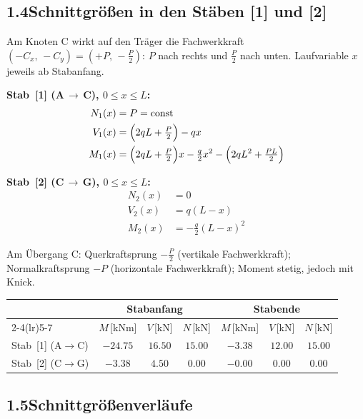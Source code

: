 \documentclass[a4paper,11pt]{article}
\begin{document}
\subsection*{1.4\quad Schnittgrößen in den Stäben [1] und [2]}

Am Knoten C wirkt auf den Träger die Fachwerkkraft
$(-C_x,\,-C_y) = (+P,\,-\tfrac{P}{2})$:
$P$ nach rechts und $\tfrac{P}{2}$ nach unten.
Laufvariable $x$ jeweils ab Stabanfang.

\textbf{Stab~[1] (A\,$\to$\,C), $0 \le x \le L$:}
\begin{align*}
  N_1(x) &= P = \text{const} \\
  V_1(x) &= \Bigl(2qL + \tfrac{P}{2}\Bigr) - qx \\
  M_1(x) &= \Bigl(2qL + \tfrac{P}{2}\Bigr)x - \tfrac{q}{2}x^2
            - \Bigl(2qL^2 + \tfrac{PL}{2}\Bigr)
\end{align*}

\textbf{Stab~[2] (C\,$\to$\,G), $0 \le x \le L$:}
\begin{align*}
  N_2(x) &= 0 \\
  V_2(x) &= q(L - x) \\
  M_2(x) &= -\tfrac{q}{2}(L - x)^2
\end{align*}

Am Übergang C: Querkraftsprung $-\tfrac{P}{2}$ (vertikale Fachwerkkraft);
Normalkraftsprung $-P$ (horizontale Fachwerkkraft); Moment stetig, jedoch mit Knick.

\medskip
\begin{center}
\begin{tabular}{l cccccc}
\toprule
 & \multicolumn{3}{c}{\textbf{Stabanfang}} & \multicolumn{3}{c}{\textbf{Stabende}} \\
\cmidrule(lr){2-4}\cmidrule(lr){5-7}
 & $M$\,[kNm] & $V$\,[kN] & $N$\,[kN]
 & $M$\,[kNm] & $V$\,[kN] & $N$\,[kN] \\
\midrule
Stab~[1] (A$\to$C) & $-24.75$ & $16.50$ & $15.00$ & $-3.38$ & $12.00$ & $15.00$ \\[3pt]
Stab~[2] (C$\to$G) & $-3.38$ & $4.50$ & $0.00$ & $-0.00$ & $0.00$ & $0.00$ \\
\bottomrule
\end{tabular}
\end{center}

\subsection*{1.5\quad Schnittgrößenverläufe}


\end{document}
